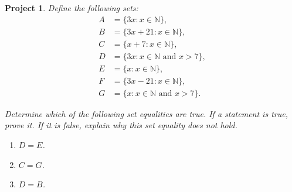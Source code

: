 \documentclass[12pt]{article}
\newtheorem{project}{Project}
\newcommand{\setprojnum}[1]{\renewcommand{\theproject}{#1}}
\begin{document}
\setprojnum{5.3}
\begin{project}
  Define the following sets:
  \begin{align*}
    A & = \{3x : x \in \mathbb{N}\},                    \\
    B & = \{3x+21 : x \in \mathbb{N}\},                 \\
    C & = \{x+7 : x \in \mathbb{N}\},                   \\
    D & = \{3x : x \in \mathbb{N} \text{ and } x > 7\}, \\
    E & = \{x : x \in \mathbb{N}\},                     \\
    F & = \{3x - 21 : x \in \mathbb{N}\},               \\
    G & = \{x : x \in \mathbb{N} \text{ and } x > 7\}.
  \end{align*}

  \noindent Determine which of the following set equalities are true. If a statement is true, prove it. If it is false, explain why this set equality does not hold.
  \begin{enumerate}
    \item[(i)] $D = E$.
    \item[(ii)] $C = G$.
    \item[(iii)] $D = B$.
  \end{enumerate}
\end{project}
\end{document}
